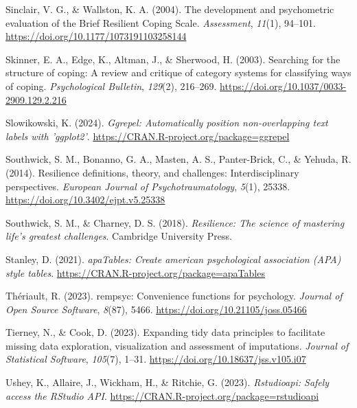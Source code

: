 \documentclass[
  man,floatsintext]{apa7}
\newlength{\cslhangindent}
\newenvironment{CSLReferences}[2] %
 {\begin{list}{}{%
  \setlength{\itemindent}{0pt}
  \setlength{\leftmargin}{0pt}
  \setlength{\parsep}{0pt}
  \ifodd #1
   \setlength{\leftmargin}{\cslhangindent}
   \setlength{\itemindent}{-1\cslhangindent}
  \fi
  \setlength{\itemsep}{#2\baselineskip}}}
 {\end{list}}
\begin{document}
\begin{CSLReferences}{1}{0}
Sinclair, V. G., \& Wallston, K. A. (2004). The development and psychometric evaluation of the {Brief} {Resilient} {Coping} {Scale}. \emph{Assessment}, \emph{11}(1), 94--101. \url{https://doi.org/10.1177/1073191103258144}

Skinner, E. A., Edge, K., Altman, J., \& Sherwood, H. (2003). Searching for the structure of coping: A review and critique of category systems for classifying ways of coping. \emph{Psychological Bulletin}, \emph{129}(2), 216--269. \url{https://doi.org/10.1037/0033-2909.129.2.216}

Slowikowski, K. (2024). \emph{Ggrepel: Automatically position non-overlapping text labels with 'ggplot2'}. \url{https://CRAN.R-project.org/package=ggrepel}

Southwick, S. M., Bonanno, G. A., Masten, A. S., Panter-Brick, C., \& Yehuda, R. (2014). Resilience definitions, theory, and challenges: Interdisciplinary perspectives. \emph{European Journal of Psychotraumatology}, \emph{5}(1), 25338. \url{https://doi.org/10.3402/ejpt.v5.25338}

Southwick, S. M., \& Charney, D. S. (2018). \emph{Resilience: The science of mastering life's greatest challenges}. Cambridge University Press.

Stanley, D. (2021). \emph{apaTables: Create american psychological association (APA) style tables}. \url{https://CRAN.R-project.org/package=apaTables}

Thériault, R. (2023). {rempsyc}: Convenience functions for psychology. \emph{Journal of Open Source Software}, \emph{8}(87), 5466. \url{https://doi.org/10.21105/joss.05466}

Tierney, N., \& Cook, D. (2023). Expanding tidy data principles to facilitate missing data exploration, visualization and assessment of imputations. \emph{Journal of Statistical Software}, \emph{105}(7), 1--31. \url{https://doi.org/10.18637/jss.v105.i07}

Ushey, K., Allaire, J., Wickham, H., \& Ritchie, G. (2023). \emph{Rstudioapi: Safely access the RStudio API}. \url{https://CRAN.R-project.org/package=rstudioapi}


\end{CSLReferences}
\end{document}
